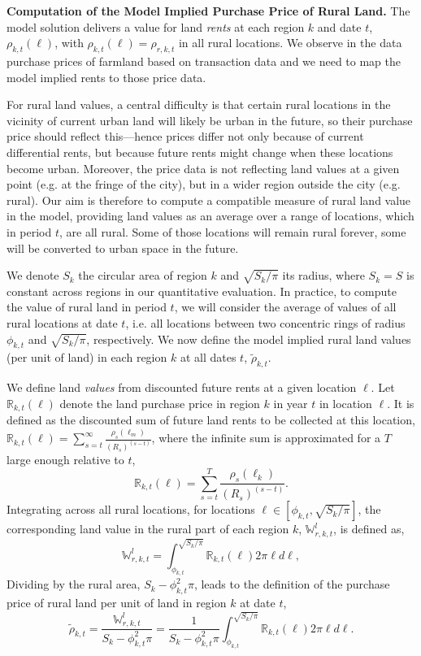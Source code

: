 \documentclass[11pt]{report}
\begin{document}
\textbf{Computation of the Model Implied Purchase Price of Rural Land.} The model solution delivers a value for land \emph{rents} at each region $k$ and date $t$, $\rho_{k,t}(\ell)$, with $\rho_{k,t}(\ell)=\rho_{r,k,t}$ in all rural locations. We observe in the data purchase prices of farmland based on transaction data and we need to map the model implied rents to those price data. 

For rural land values, a central difficulty is that certain rural locations in the vicinity of current urban land will likely be urban in the future, so their purchase price should reflect this---hence prices differ not only because of current differential rents, but because future rents might change when these locations become urban. Moreover, the price data is not reflecting land values at a given point (e.g. at the fringe of the city), but in a wider region outside the city (e.g. rural). Our aim is therefore to compute a compatible measure of rural land value in the model, providing land values as an average over a range of locations, which in period $t$, are all rural. Some of those locations will remain rural forever, some will be converted to urban space in the future. 

We denote $S_k$ the circular area of region $k$ and $\sqrt{S_k/\pi}$ its radius, where $S_k=S$ is constant across regions in our quantitative evaluation. In practice, to compute the value of rural land in period $t$, we will consider the average of values of all rural locations at date $t$, i.e. all locations between two concentric rings of radius $\phi_{k,t}$ and $\sqrt{S_k/\pi}$, respectively. We now define the model implied rural land values (per unit of land) in each region $k$ at all dates $t$, $\tilde{\rho}_{k,t}$.

We define land \emph{values} from discounted future rents at a given location $\ell$. Let $\mathbb{R}_{k,t}(\ell)$ denote the land purchase price in region $k$ in year $t$ in location $\ell$. It is defined as the discounted sum of future land rents to be collected at this location, $\mathbb{R}_{k,t}(\ell) = \sum_{s=t}^\infty \frac{\rho_s(\ell_m)}{(R_s)^{(s-t)}}$,
where the infinite sum is approximated for a $T$ large enough relative to $t$, 
\begin{equation*}
\mathbb{R}_{k,t}(\ell) = \sum_{s=t}^T \frac{\rho_s(\ell_k)}{(R_s)^{(s-t)}}.
\end{equation*}
Integrating across all rural locations, for locations $\ell \in [\phi_{k,t}, \sqrt{S_k/\pi}]$, the corresponding land value in the rural part of each region $k$,  $\mathbb{W}_{r,k,t}^l$, is defined as,
\begin{equation*}
\mathbb{W}_{r,k,t}^l=\int_{\phi_{k,t}}^{\sqrt{S_{k}/\pi}} \mathbb{R}_{k,t}(\ell)2 \pi \ell d\ell,
\end{equation*}
Dividing by the rural area, $S_k - \phi_{k,t}^2 \pi$, leads to the definition of the purchase price of rural land per unit of land in region $k$ at date $t$,
\begin{equation}
	\tilde{\rho}_{k,t}=\frac{\mathbb{W}_{r,k,t}^l}{S_k - \phi_{k,t}^2 \pi}=\frac{1}{S_k - \phi_{k,t}^2 \pi}\int_{\phi_{k,t}}^{\sqrt{S_{k}/\pi}} \mathbb{R}_{k,t}(\ell)2 \pi \ell d\ell. \label{B-eq:land-price-simple}
\end{equation}
\end{document}
